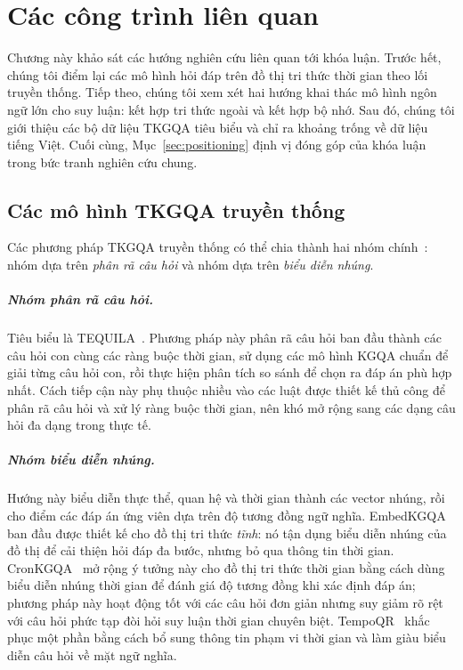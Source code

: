 \chapter{Các công trình liên quan}
\label{ch:related}

Chương này khảo sát các hướng nghiên cứu liên quan tới khóa luận. Trước hết, chúng tôi điểm lại
các mô hình hỏi đáp trên đồ thị tri thức thời gian theo lối truyền thống. Tiếp theo, chúng tôi xem
xét hai hướng khai thác mô hình ngôn ngữ lớn cho suy luận: kết hợp tri thức ngoài và kết hợp bộ
nhớ. Sau đó, chúng tôi giới thiệu các bộ dữ liệu TKGQA tiêu biểu và chỉ ra khoảng trống về dữ liệu
tiếng Việt. Cuối cùng, Mục~\ref{sec:positioning} định vị đóng góp của khóa luận trong bức tranh
nghiên cứu chung.

\section{Các mô hình TKGQA truyền thống}
\label{sec:trad-tkgqa}

Các phương pháp TKGQA truyền thống có thể chia thành hai nhóm chính~\cite{chen2024ari}: nhóm dựa
trên \textit{phân rã câu hỏi} và nhóm dựa trên \textit{biểu diễn nhúng}.

\paragraph{Nhóm phân rã câu hỏi.} Tiêu biểu là TEQUILA~\cite{jia2018tequila}. Phương pháp này phân
rã câu hỏi ban đầu thành các câu hỏi con cùng các ràng buộc thời gian, sử dụng các mô hình KGQA
chuẩn để giải từng câu hỏi con, rồi thực hiện phân tích so sánh để chọn ra đáp án phù hợp nhất.
Cách tiếp cận này phụ thuộc nhiều vào các luật được thiết kế thủ công để phân rã câu hỏi và xử lý
ràng buộc thời gian, nên khó mở rộng sang các dạng câu hỏi đa dạng trong thực tế.

\paragraph{Nhóm biểu diễn nhúng.} Hướng này biểu diễn thực thể, quan hệ và thời gian thành các
vector nhúng, rồi cho điểm các đáp án ứng viên dựa trên độ tương đồng ngữ nghĩa. EmbedKGQA~
\cite{saxena2020embedkgqa} ban đầu được thiết kế cho đồ thị tri thức \emph{tĩnh}: nó tận dụng biểu
diễn nhúng của đồ thị để cải thiện hỏi đáp đa bước, nhưng bỏ qua thông tin thời gian.
CronKGQA~\cite{saxena2021cronkgqa} mở rộng ý tưởng này cho đồ thị tri thức thời gian bằng cách dùng
biểu diễn nhúng thời gian để đánh giá độ tương đồng khi xác định đáp án; phương pháp này hoạt động
tốt với các câu hỏi đơn giản nhưng suy giảm rõ rệt với câu hỏi phức tạp đòi hỏi suy luận thời gian
chuyên biệt. TempoQR~\cite{mavromatis2021tempoqr} khắc phục một phần bằng cách bổ sung thông tin
phạm vi thời gian và làm giàu biểu diễn câu hỏi về mặt ngữ nghĩa.

